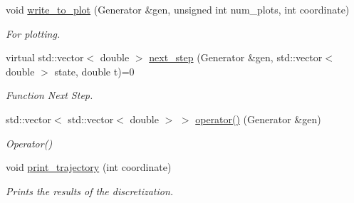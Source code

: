 \begin{DoxyCompactItemize}
void \mbox{\hyperlink{classprocess_a5fc8d61bdb3373b5f1a2b123bd8b2556}{write\+\_\+to\+\_\+plot}} (Generator \&gen, unsigned int num\+\_\+plots, int coordinate)
\begin{DoxyCompactList}\small\item\em For plotting. \end{DoxyCompactList}\item 
virtual std\+::vector$<$ double $>$ \mbox{\hyperlink{classprocess_a55c46e4b4ab1992ce09f4133fb484fd6}{next\+\_\+step}} (Generator \&gen, std\+::vector$<$ double $>$ state, double t)=0
\begin{DoxyCompactList}\small\item\em Function Next Step. \end{DoxyCompactList}\item 
std\+::vector$<$ std\+::vector$<$ double $>$ $>$ \mbox{\hyperlink{classprocess_ac728fbbd27c9e9d0b590e18e132480af}{operator()}} (Generator \&gen)
\begin{DoxyCompactList}\small\item\em Operator() \end{DoxyCompactList}\item 
\mbox{\label{classprocess_ac74ffbcbb3f61ed3c9b17df1e844e4ee}} 
void \mbox{\hyperlink{classprocess_ac74ffbcbb3f61ed3c9b17df1e844e4ee}{print\+\_\+trajectory}} (int coordinate)
\begin{DoxyCompactList}\small\item\em Prints the results of the discretization. \end{DoxyCompactList}\end{DoxyCompactItemize}
